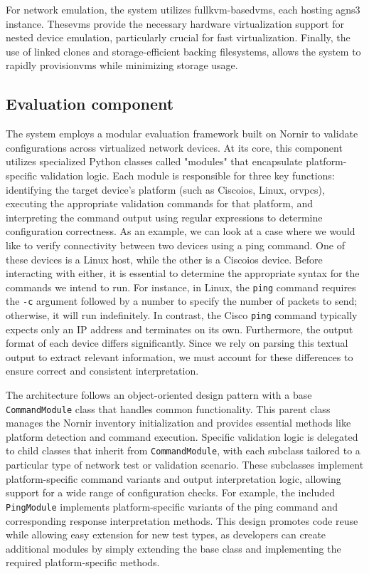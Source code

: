         For network emulation, the system utilizes full\ac{kvm}-based\ac{vm}s, each hosting a\ac{gns3} instance. These\ac{vm}s 
        provide the necessary hardware virtualization support for nested device emulation, particularly crucial for fast virtualization. 
        Finally, the use of linked clones and storage-efficient backing filesystems, allows the system to rapidly provision\ac{vm}s 
        while minimizing storage usage.
    
    \subsection{Evaluation component}

        The system employs a modular evaluation framework built on Nornir to validate configurations across virtualized network devices. 
        At its core, this component utilizes specialized Python classes called "modules" that encapsulate platform-specific validation logic. 
        Each module is responsible for three key functions: identifying the target device's platform (such as Cisco\ac{ios}, Linux, or\ac{vpcs}), 
        executing the appropriate validation commands for that platform, and interpreting the command output using regular expressions to 
        determine configuration correctness. As an example, we can look at a case where we would like to verify connectivity between two devices 
        using a ping command. One of these devices is a Linux host, while the other is a Cisco\ac{ios} device. Before interacting with either, 
        it is essential to determine the appropriate syntax for the commands we intend to run. For instance, in Linux, the \texttt{ping} command 
        requires the \texttt{-c} argument followed by a number to specify the number of packets to send; otherwise, it will run indefinitely. 
        In contrast, the Cisco \texttt{ping} command typically expects only an IP address and terminates on its own. Furthermore, the output 
        format of each device differs significantly. Since we rely on parsing this textual output to extract relevant information, we must 
        account for these differences to ensure correct and consistent interpretation.

        The architecture follows an object-oriented design pattern with a base \texttt{CommandModule} class that handles common functionality. 
        This parent class manages the Nornir inventory initialization and provides essential methods like platform detection and command execution. 
        Specific validation logic is delegated to child classes that inherit from \texttt{CommandModule}, with each subclass tailored to a particular 
        type of network test or validation scenario. These subclasses implement platform-specific command variants and output interpretation logic, 
        allowing support for a wide range of configuration checks. For example, the included \texttt{PingModule} implements platform-specific variants 
        of the ping command and corresponding response interpretation methods. This design promotes code reuse while allowing easy extension for new 
        test types, as developers can create additional modules by simply extending the base class and implementing the required platform-specific methods.
        
